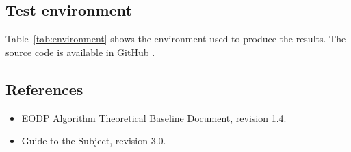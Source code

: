 \subsection{Test environment}
Table~\ref{tab:environment} shows the environment used to produce the results.
The source code is available in GitHub \cite{repo}.

\begin{table}[H]
\centering
\caption{Test environment.}
\label{tab:environment}

\end{table}

\subsection{References}
\begin{itemize}
\item \cite{atbd} EODP Algorithm Theoretical Baseline Document, revision 1.4.
\item \cite{guide} Guide to the Subject, revision 3.0.
\end{itemize}
